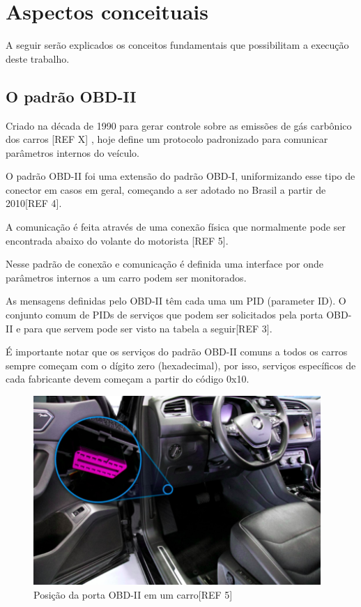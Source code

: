 \chapter{Aspectos conceituais}
\label{CAP2}

A seguir serão explicados os conceitos fundamentais que possibilitam a execução deste trabalho. 


\section{O padrão OBD-II}

Criado na década de 1990 para gerar controle sobre as emissões de gás carbônico dos carros [REF X] \cite{patent}, hoje define um protocolo padronizado para comunicar parâmetros internos do veículo.
    
O padrão OBD-II foi uma extensão do padrão OBD-I, uniformizando esse tipo de conector em casos em geral, começando a ser adotado no Brasil a partir de 2010[REF 4].

A comunicação é feita através de uma conexão física que normalmente pode ser encontrada abaixo do volante do motorista [REF 5].

Nesse padrão de conexão e comunicação é definida uma interface por onde parâmetros internos a um carro podem ser monitorados.

As mensagens definidas pelo OBD-II têm cada uma um PID (parameter ID). O conjunto comum de PIDs de serviços que podem ser solicitados pela porta OBD-II e para que servem pode ser visto na tabela a seguir[REF 3].



É importante notar que os serviços do padrão OBD-II comuns a todos os carros sempre começam com o dígito zero (hexadecimal), por isso, serviços específicos de cada fabricante devem começam a partir do código 0x10.

\begin{figure}[hp]
    \centering
    
    \includegraphics[]{figures/localizacao_obd2.png}
    
    \caption{Posição da porta OBD-II em um carro[REF 5]}
\end{figure}

